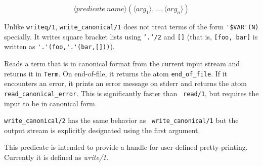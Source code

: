 \begin{description}
		\[ \langle predicate\ name \rangle
			(\langle arg_1 \rangle, \ldots,
			 \langle arg_n \rangle) \]

    Unlike {\tt writeq/1}, {\tt write\_canonical/1} does not treat terms 
    of the form \verb|'$VAR'(N)| specially. It writes square bracket lists 
    using {\tt '.'/2} and {\tt []} (that is, {\tt [foo, bar]} is written 
    as \verb|'.'(foo,'.'(bar,[]))|).

  
Reads a term that is in canonical format from the
current input stream and returns it in {\tt Term}. On end-of-file, it
returns the atom {\tt end\_of\_file}.  If it encounters an error, it
prints an error message on stderr and returns the atom {\tt
read\_canonical\_error}. This is significantly faster than {\tt
read/1}, but requires the input to be in canonical form.

	{\tt write\_canonical/2} has the same behavior as {\tt
	write\_canonical/1} but the output stream is explicitly
	designated using the first argument.

    This predicate is intended to provide a handle for user-defined 
    pretty-printing.  Currently it is defined as {\em write/1}.

\end{description}

